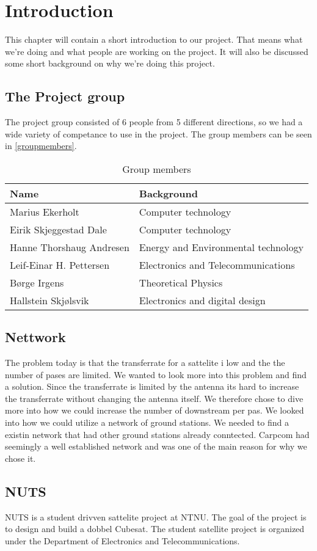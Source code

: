 \chapter{Introduction}
\label{chap:introduction}
This chapter will contain a short introduction to our project. That means what we're doing and what people are working on the project. It will also be discussed some short background on why we're doing this project.
\section{The Project group}
The project group consisted of 6 people from 5 different directions, so we had a wide variety of competance to use in the project. The group members can be seen in \autoref{groupmembers}.
\begin{table}
	\begin{center}
		\begin{tabular}{|p{4cm}|p{12cm}|}   
			\hline      
			\bf{Name} & \bf{Background} \\ 
			\hline
			Marius Ekerholt & Computer technology\\     
			\hline
			Eirik Skjeggestad Dale & Computer technology\\     
			\hline
			Hanne Thorshaug Andresen & Energy and Environmental technology\\     
			\hline
			Leif-Einar H. Pettersen & Electronics and Telecommunications\\     
			\hline
			Børge Irgens & Theoretical Physics\\     
			\hline
			Hallstein Skjølsvik & Electronics and digital design\\     
			\hline
		 \end{tabular}
	\end{center}
	\caption{Group members}
	\label{tab:groupmembers}
\end{table}

\section{Nettwork}

The problem today is that the transferrate for a sattelite i low and the the number of pases are limited. We wanted to look more into this problem and find a solution. Since the transferrate is limited by the antenna its hard to increase the transferrate without changing the antenna itself. We therefore chose to dive more into how we could increase the number of downstream per pas. We looked into how we could utilize a network of ground stations. We needed to find a existin network that had other ground stations already conntected. Carpcom had seemingly a well established network and was one of the main reason for why we chose it.

\section{NUTS}

NUTS is a student drivven sattelite project at NTNU. The goal of the project is to design and build a dobbel Cubesat. The student satellite project is organized under the  Department of Electronics and Telecommunications. 